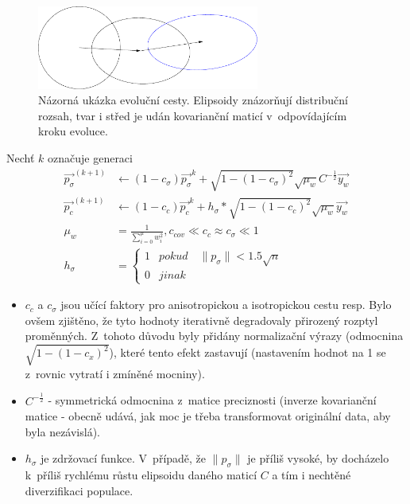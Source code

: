 \begin{figure}[hbt]
	\centering
	\includegraphics[width=0.65\textwidth]{obrazky-figures/evoPath.pdf}
	\caption{Názorná ukázka evoluční cesty. Elipsoidy znázorňují distribuční rozsah, tvar i střed je udán kovarianční maticí v~odpovídajícím kroku evoluce.}
	\label{fg:evoPath}
\end{figure}

Nechť $k$ označuje generaci
    \begin{subequations}
    \label{eq:cmaes}
    \begin{align}
        \Vec{p_\sigma}^{(k+1)} &\leftarrow (1 - c_{\sigma})\Vec{p_\sigma}^{k} + \sqrt{1 - (1 - c_{\sigma})^2} \sqrt{\mu_{w}}C^{-\frac{1}{2}}\Vec{y_w} \label{eq:cmaes_po}\\
        \Vec{p_c}^{(k+1)} &\leftarrow (1 - c_{c})\Vec{p_c}^{k} + h_{\sigma}*\sqrt{1 - (1 - c_{c})^2} \sqrt{\mu_{w}}\Vec{y_w} \label{eq:cmaes_pc}\\
        \mu_{w} &= \frac{1}{\sum_{i=0}^{\mu}w_{i}^{2}}, c_{cov} \ll c_c \approx c_{\sigma} \ll 1 \\
        h_{\sigma} &= 
        \begin{cases} 
            1       & pokud \quad \| p_{\sigma}\| < 1.5\sqrt{n}\\
            0       & jinak
        \end{cases}
    \end{align}
    \label{eq:pc}
    \end{subequations} 
\begin{itemize}
    \item $c_{c}$ a $c_{\sigma}$ jsou učící faktory pro anisotropickou a isotropickou cestu resp. Bylo ovšem zjištěno, že tyto hodnoty iterativně degradovaly přirozený rozptyl proměnných. Z~tohoto důvodu byly přidány normalizační výrazy (odmocnina $\sqrt{1-(1-c_{x})^2}$), které tento efekt zastavují (nastavením hodnot na 1 se z~rovnic vytratí i zmíněné mocniny).
    \item $C^{-\frac{1}{2}}$ - symmetrická odmocnina z~matice preciznosti (inverze kovarianční matice - obecně udává, jak moc je třeba transformovat originální data, aby byla nezávislá).
    \item $h_{\sigma}$ je zdržovací funkce. V~případě, že $\| p_{\sigma}\|$ je příliš vysoké, by docházelo k~příliš rychlému růstu elipsoidu daného maticí $C$ a tím i nechtěné diverzifikaci populace.
\end{itemize}


